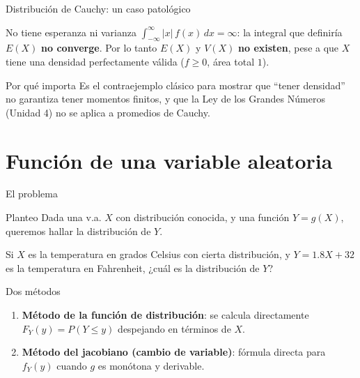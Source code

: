 \documentclass[aspectratio=169,11pt]{beamer}
\begin{document}
\begin{frame}{Distribución de Cauchy: un caso patológico}
\begin{alertblock}{No tiene esperanza ni varianza}
$\displaystyle\int_{-\infty}^\infty |x|\,f(x)\,dx = \infty$: la integral que definiría $E(X)$ \textbf{no converge}. Por lo tanto $E(X)$ y $V(X)$ \textbf{no existen}, pese a que $X$ tiene una densidad perfectamente válida ($f\ge0$, área total $1$).
\end{alertblock}

\begin{block}{Por qué importa}
Es el contraejemplo clásico para mostrar que ``tener densidad'' no garantiza tener momentos finitos, y que la Ley de los Grandes Números (Unidad 4) no se aplica a promedios de Cauchy.
\end{block}
\end{frame}

\section{Función de una variable aleatoria}

\begin{frame}{El problema}
\begin{block}{Planteo}
Dada una v.a. $X$ con distribución conocida, y una función $Y=g(X)$, queremos hallar la distribución de $Y$.
\end{block}
\begin{example}
Si $X$ es la temperatura en grados Celsius con cierta distribución, y $Y=1.8X+32$ es la temperatura en Fahrenheit, ¿cuál es la distribución de $Y$?
\end{example}

\begin{alertblock}{Dos métodos}
\begin{enumerate}
\item \textbf{Método de la función de distribución}: se calcula directamente $F_Y(y)=P(Y\le y)$ despejando en términos de $X$.
\item \textbf{Método del jacobiano (cambio de variable)}: fórmula directa para $f_Y(y)$ cuando $g$ es monótona y derivable.
\end{enumerate}
\end{alertblock}
\end{frame}
\end{document}
